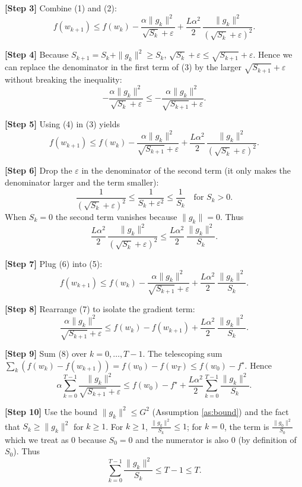 \documentclass[11pt]{article}
\begin{document}
\noindent\textbf{[Step 3]} Combine (1) and (2):
\[
f(w_{k+1})\le f(w_{k})
   -\frac{\alpha\|g_{k}\|^{2}}{\sqrt{S_{k}}+\varepsilon}
   +\frac{L\alpha^{2}}{2}\,
    \frac{\|g_{k}\|^{2}}{(\sqrt{S_{k}}+\varepsilon)^{2}}.
\tag{3}
\]

\noindent\textbf{[Step 4]} Because $S_{k+1}=S_{k}+\|g_{k}\|^{2}\ge S_{k}$,
$\sqrt{S_{k}}+\varepsilon\le\sqrt{S_{k+1}}+\varepsilon$.
Hence we can replace the denominator in the first term of (3) by the larger
$\sqrt{S_{k+1}}+\varepsilon$ without breaking the inequality:
\[
-\frac{\alpha\|g_{k}\|^{2}}{\sqrt{S_{k}}+\varepsilon}
\le -\frac{\alpha\|g_{k}\|^{2}}{\sqrt{S_{k+1}}+\varepsilon}.
\tag{4}
\]

\noindent\textbf{[Step 5]} Using (4) in (3) yields
\[
f(w_{k+1})\le f(w_{k})
   -\frac{\alpha\|g_{k}\|^{2}}{\sqrt{S_{k+1}}+\varepsilon}
   +\frac{L\alpha^{2}}{2}\,
    \frac{\|g_{k}\|^{2}}{(\sqrt{S_{k}}+\varepsilon)^{2}}.
\tag{5}
\]

\noindent\textbf{[Step 6]} Drop the $\varepsilon$ in the denominator of the
second term (it only makes the denominator larger and the term smaller):
\[
\frac{1}{(\sqrt{S_{k}}+\varepsilon)^{2}}
   \le \frac{1}{S_{k}+\varepsilon^{2}}
   \le \frac{1}{S_{k}} \quad\text{for }S_{k}>0.
\]
When $S_{k}=0$ the second term vanishes because $\|g_{k}\|=0$.
Thus
\[
\frac{L\alpha^{2}}{2}\,
    \frac{\|g_{k}\|^{2}}{(\sqrt{S_{k}}+\varepsilon)^{2}}
\le \frac{L\alpha^{2}}{2}\,
    \frac{\|g_{k}\|^{2}}{S_{k}}.
\tag{6}
\]

\noindent\textbf{[Step 7]} Plug (6) into (5):
\[
f(w_{k+1})\le f(w_{k})
   -\frac{\alpha\|g_{k}\|^{2}}{\sqrt{S_{k+1}}+\varepsilon}
   +\frac{L\alpha^{2}}{2}\,
    \frac{\|g_{k}\|^{2}}{S_{k}}.
\tag{7}
\]

\noindent\textbf{[Step 8]} Rearrange (7) to isolate the gradient term:
\[
\frac{\alpha\|g_{k}\|^{2}}{\sqrt{S_{k+1}}+\varepsilon}
\le f(w_{k})-f(w_{k+1})
   +\frac{L\alpha^{2}}{2}\,
    \frac{\|g_{k}\|^{2}}{S_{k}}.
\tag{8}
\]

\noindent\textbf{[Step 9]} Sum (8) over $k=0,\dots,T-1$.
The telescoping sum $\sum_{k}(f(w_{k})-f(w_{k+1}))=f(w_{0})-f(w_{T})\le f(w_{0})-f^{\star}$.
Hence
\[
\alpha\sum_{k=0}^{T-1}\frac{\|g_{k}\|^{2}}{\sqrt{S_{k+1}}+\varepsilon}
\le f(w_{0})-f^{\star}
   +\frac{L\alpha^{2}}{2}\sum_{k=0}^{T-1}\frac{\|g_{k}\|^{2}}{S_{k}}.
\tag{9}
\]

\noindent\textbf{[Step 10]} Use the bound $\|g_{k}\|^{2}\le G^{2}$ (Assumption
\ref{as:bound}) and the fact that $S_{k}\ge \|g_{k}\|^{2}$ for $k\ge1$.
For $k\ge1$, $\frac{\|g_{k}\|^{2}}{S_{k}}\le 1$; for $k=0$, the term is
$\frac{\|g_{0}\|^{2}}{S_{0}}$ which we treat as $0$ because $S_{0}=0$ and
the numerator is also $0$ (by definition of $S_{0}$). Thus
\[
\sum_{k=0}^{T-1}\frac{\|g_{k}\|^{2}}{S_{k}}\le T-1\le T.
\tag{10}
\]
\end{document}
